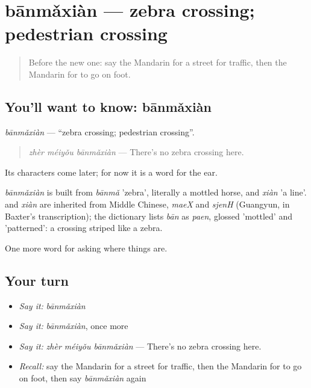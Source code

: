 \section[bānmǎxiàn]{bānmǎxiàn — zebra crossing; pedestrian crossing}

\label{lesson:ZH-C194-banmaxian}



\begin{quote}
Before the new one: say the Mandarin for a street for traffic, then the Mandarin for to go on foot.
\end{quote}

\subsection*{You'll want to know: bānmǎxiàn}
\emph{bānmǎxiàn} — \textquotedblleft{}zebra crossing; pedestrian crossing\textquotedblright{}.

\begin{quote}
\emph{zhèr méiyǒu bānmǎxiàn} — There's no zebra crossing here.
\end{quote}

Its characters come later; for now it is a word for the ear.

\begin{cousinweb}
\emph{bānmǎxiàn} is built from \emph{bānmǎ} 'zebra', literally a mottled horse, and \emph{xiàn} 'a line'.  and \emph{xiàn} are inherited from Middle Chinese, \emph{maeX} and \emph{sjenH} (Guangyun, in Baxter's transcription); the dictionary lists \emph{bān} as \emph{paen}, glossed 'mottled' and 'patterned': a crossing striped like a zebra.
\end{cousinweb}

\begin{grammarlens}[title={What you've built}]
One more word for asking where things are.
\end{grammarlens}

\subsection*{Your turn}
\begin{itemize}
\raggedright
  \item \emph{Say it:} \emph{bānmǎxiàn}
  \item \emph{Say it:} \emph{bānmǎxiàn}, once more
  \item \emph{Say it:} \emph{zhèr méiyǒu bānmǎxiàn} — There's no zebra crossing here.
  \item \emph{Recall:} say the Mandarin for a street for traffic, then the Mandarin for to go on foot, then say \emph{bānmǎxiàn} again
\end{itemize}

